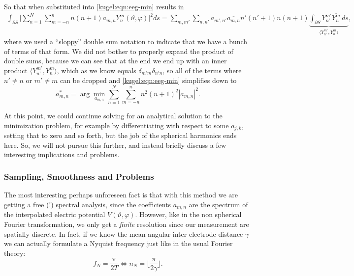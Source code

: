 So that when substituted into \eqref{kugel:eqn:eeg-min} results in
\begin{align*}
  \int_{\partial S} \biggl|
    \sum_{n=1}^N \sum_{m=-n}^n n(n+1) a_{m,n}
    Y^m_n(\vartheta, \varphi)
  \biggr|^2 ds
  = \sum_{m, m'} \sum_{n, n'} a_{m',n'} \overline{a_{m,n}}
    n'(n'+1) n(n+1)
    \underbrace{\int_{\partial S} Y^{m'}_{n'} \overline{Y^m_n} \, ds}_{
      \langle Y^{m'}_{n'}, Y^m_n \rangle
    },
\end{align*}
where we used a ``sloppy'' double sum notation to indicate that we have a bunch
of terms of that form. We did not bother to properly expand the product of
double sums, because we can see that at the end we end up with an inner product
$\langle Y^{m'}_{n'}, Y^m_n \rangle$, which as we know equals $\delta_{m'm}
\delta_{n'n}$, so all of the terms where $n' \neq n$ or $m' \neq m$ can be
dropped and \eqref{kugel:eqn:eeg-min} simplifies down to
\nocite{pascual-marqui_current_1988}
\begin{equation}
  a^*_{m,n} = \arg \min_{a_{m,n}} 
    \sum_{n=1}^N \sum_{m=-n}^n n^2 (n+1)^2 |a_{m,n}|^2.
\end{equation}

At this point, we could continue solving for an analytical solution to the
minimization problem, for example by differentiating with respect to some
$a_{j,k}$, setting that to zero and so forth, but the job of the spherical
harmonics ends here. So, we will not pursue this further, and instead briefly
discuss a few interesting implications and problems. 

\subsubsection{Sampling, Smoothness and Problems}
\nocite{wingeier_spherical_2001, ruffini_spherical_2002}

The most interesting perhaps unforeseen fact is that with this method we are
getting a free (!) spectral analysis, since the coefficients $a_{m,n}$ are the
spectrum of the interpolated electric potential $V(\vartheta, \varphi)$.
However, like in the non spherical Fourier transformation, we only get a
\emph{finite} resolution since our measurement are spatially discrete. In fact,
if we know the mean angular inter-electrode distance $\gamma$ we can actually
formulate a Nyquist frequency just like in the usual Fourier theory:
\begin{equation}
  f_N = \frac{\pi}{2T}
  \iff
  n_N = \biggl\lfloor \frac{\pi}{2\gamma} \biggr\rfloor.
\end{equation}

